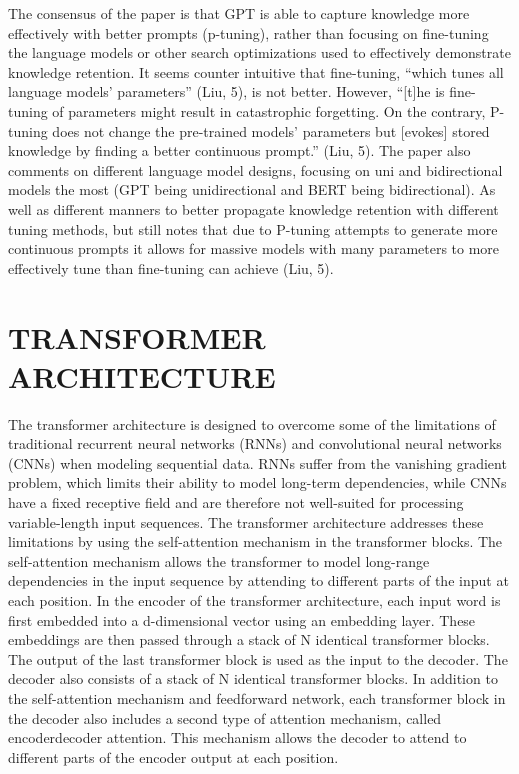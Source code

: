 \documentclass[letterpaper, 10 pt, conference]{ieeeconf}  %
\begin{document}
The consensus of the paper is that GPT is able to capture knowledge more effectively with better prompts (p-tuning),
rather than focusing on fine-tuning the language models or other search optimizations used to effectively demonstrate knowledge
retention. It seems counter intuitive that fine-tuning, “which tunes all language models’ parameters” (Liu, 5), is not better. However,
“[t]he is fine-tuning of parameters might result in catastrophic forgetting. On the contrary, P-tuning does not change the pre-trained
models’ parameters but [evokes] stored knowledge by finding a better continuous prompt.” (Liu, 5). The paper also comments on
different language model designs, focusing on uni and bidirectional models the most (GPT being unidirectional and BERT being
bidirectional). As well as different manners to better propagate knowledge retention with different tuning methods, but still notes
that due to P-tuning attempts to generate more continuous prompts it allows for massive models with many parameters to more
effectively tune than fine-tuning can achieve (Liu, 5).

\section{TRANSFORMER ARCHITECTURE}

The transformer architecture is designed to overcome some of the limitations of traditional recurrent neural networks (RNNs) and
convolutional neural networks (CNNs) when modeling sequential data. RNNs suffer from the vanishing gradient problem, which
limits their ability to model long-term dependencies, while CNNs have a fixed receptive field and are therefore not well-suited for
processing variable-length input sequences.
The transformer architecture addresses these limitations by using the self-attention mechanism in the transformer blocks.
The self-attention mechanism allows the transformer to model long-range dependencies in the input sequence by attending to
different parts of the input at each position.
In the encoder of the transformer architecture, each input word is first embedded into a d-dimensional vector using an
embedding layer. These embeddings are then passed through a stack of N identical transformer blocks. The output of the last
transformer block is used as the input to the decoder.
The decoder also consists of a stack of N identical transformer blocks. In addition to the self-attention mechanism and
feedforward network, each transformer block in the decoder also includes a second type of attention mechanism, called encoderdecoder attention. This mechanism allows the decoder to attend to different parts of the encoder output at each position.
\end{document}
